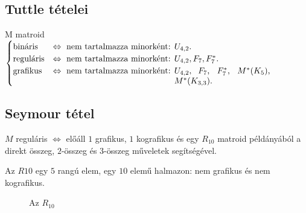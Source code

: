 \subsection{Tuttle tételei}

M matroid $\begin{cases}
\mbox{bináris} &\Leftrightarrow \mbox{ nem tartalmazza minorként: } U_{4,2}. \\ 
\mbox{reguláris} &\Leftrightarrow \mbox{ nem tartalmazza minorként: } U_{4,2}, F_7, F_7^*. \\
\mbox{grafikus} &\Leftrightarrow \mbox{ nem tartalmazza minorként: } \parbox[t]{4cm}{
$U_{4,2},$ $F_7$, $F_7^*$, $M^*(K_5)$, $M^*(K_{3,3})$.} \\
\end{cases}$

\subsection{Seymour tétel}

$M$ reguláris $\Leftrightarrow$  előáll $1$ grafikus, $1$ kografikus és egy
$R_{10}$ matroid példányából a direkt összeg, $2$-összeg és $3$-összeg műveletek
segítségével.

Az $R10$ egy $5$ rangú elem, egy $10$ elemű halmazon: nem grafikus és nem
kografikus.

\begin{figure}[htb]
\caption{Az $R_{10}$}
\label{fig:Seymour}
\centering {} 
\end{figure} 